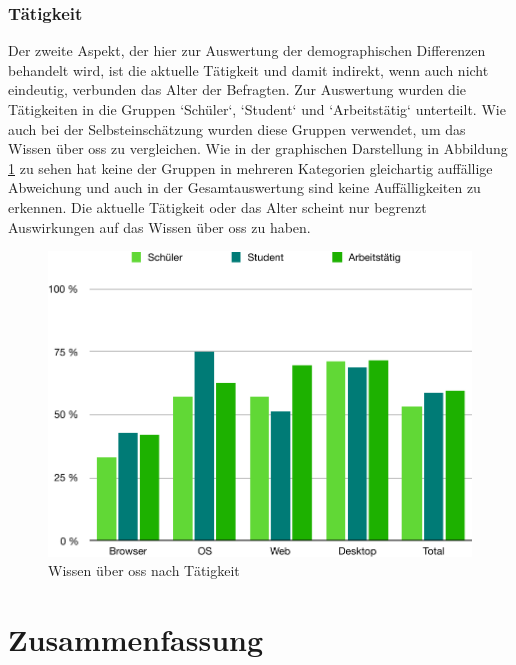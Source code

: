 \documentclass[a4paper]{article}
\begin{document}
            \subsubsection{Tätigkeit}
                Der zweite Aspekt, der hier zur Auswertung der demographischen Differenzen behandelt wird, ist die aktuelle Tätigkeit und damit indirekt, wenn auch nicht eindeutig, verbunden das Alter der Befragten. Zur Auswertung wurden die Tätigkeiten in die Gruppen `Schüler`, `Student` und `Arbeitstätig` unterteilt. Wie auch bei der Selbsteinschätzung wurden diese Gruppen verwendet, um das Wissen über \gls{oss} zu vergleichen. Wie in der graphischen Darstellung in Abbildung \ref{figure:knowledge_by_occupation} zu sehen hat keine der Gruppen in mehreren Kategorien gleichartig auffällige Abweichung und auch in der Gesamtauswertung sind keine Auffälligkeiten zu erkennen. Die aktuelle Tätigkeit oder das Alter scheint nur begrenzt Auswirkungen auf das Wissen über \gls{oss} zu haben.
            
            \begin{figure}
                \includegraphics[width=\textwidth]{assets/results/openSourceJudging/openSourceJudgingDetailedOSSOnlyByOccupation.pdf}
                \caption{Wissen über \gls{oss} nach Tätigkeit}
                \label{figure:knowledge_by_occupation}
            \end{figure}
            
    
    
    \clearpage
    \section{Zusammenfassung}
\end{document}
